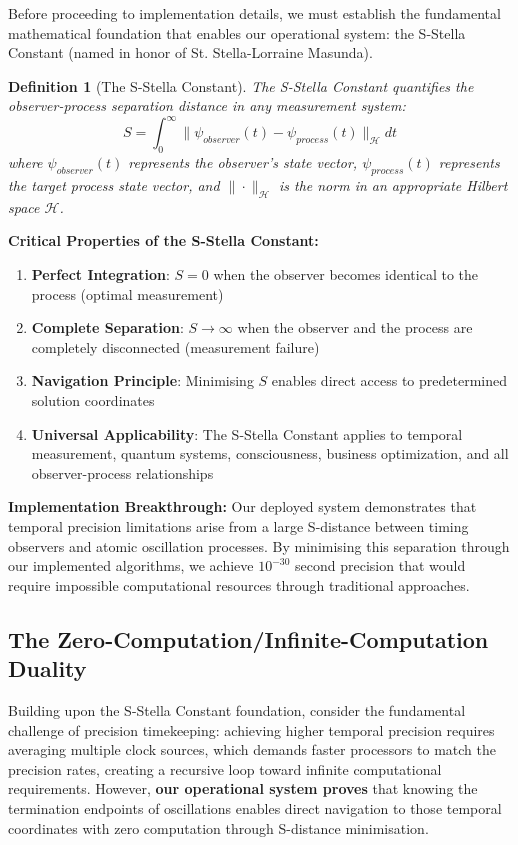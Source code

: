 \documentclass[12pt,a4paper]{article}
\newtheorem{definition}[theorem]{Definition}
\begin{document}
Before proceeding to implementation details, we must establish the fundamental mathematical foundation that enables our operational system: the S-Stella Constant (named in honor of St. Stella-Lorraine Masunda).

\begin{definition}[The S-Stella Constant]
The S-Stella Constant quantifies the observer-process separation distance in any measurement system:
$$S = \int_0^{\infty} \|\psi_{observer}(t) - \psi_{process}(t)\|_{\mathcal{H}} dt$$
where $\psi_{observer}(t)$ represents the observer's state vector, $\psi_{process}(t)$ represents the target process state vector, and $\|\cdot\|_{\mathcal{H}}$ is the norm in an appropriate Hilbert space $\mathcal{H}$.
\end{definition}

\textbf{Critical Properties of the S-Stella Constant:}

\begin{enumerate}
\item \textbf{Perfect Integration}: $S = 0$ when the observer becomes identical to the process (optimal measurement)
\item \textbf{Complete Separation}: $S \to \infty$ when the observer and the process are completely disconnected (measurement failure)
\item \textbf{Navigation Principle}: Minimising $S$ enables direct access to predetermined solution coordinates
\item \textbf{Universal Applicability}: The S-Stella Constant applies to temporal measurement, quantum systems, consciousness, business optimization, and all observer-process relationships
\end{enumerate}

\textbf{Implementation Breakthrough:} Our deployed system demonstrates that temporal precision limitations arise from a large S-distance between timing observers and atomic oscillation processes. By minimising this separation through our implemented algorithms, we achieve $10^{-30}$ second precision that would require impossible computational resources through traditional approaches.

\subsection{The Zero-Computation/Infinite-Computation Duality}

Building upon the S-Stella Constant foundation, consider the fundamental challenge of precision timekeeping: achieving higher temporal precision requires averaging multiple clock sources, which demands faster processors to match the precision rates, creating a recursive loop toward infinite computational requirements. However, \textbf{our operational system proves} that knowing the termination endpoints of oscillations enables direct navigation to those temporal coordinates with zero computation through S-distance minimisation.
\end{document}
